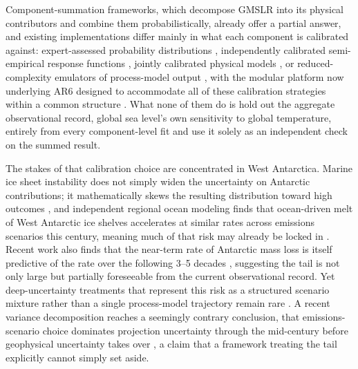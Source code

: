 \documentclass[12pt]{article}
\begin{document}
Component-summation frameworks, which decompose GMSLR into its physical
contributors and combine them probabilistically, already offer a partial
answer, and existing implementations differ mainly in what each component
is calibrated against: expert-assessed probability distributions
\citep{Kopp2014}, independently calibrated semi-empirical response
functions \citep{Mengel2016}, jointly calibrated physical models
\citep{Wong2017}, or reduced-complexity emulators of process-model output
\citep{Nauels2017}, with the modular platform now underlying AR6 designed
to accommodate all of these calibration strategies within a common
structure \citep{Kopp2023}. What none of them do is hold out the aggregate
observational record, global sea level's own sensitivity to global
temperature, entirely from every component-level fit and use it solely as
an independent check on the summed result.

The stakes of that calibration choice are concentrated in West Antarctica.
Marine ice sheet instability does not simply widen the uncertainty on
Antarctic contributions; it mathematically skews the resulting
distribution toward high outcomes \citep{Robel2019}, and independent
regional ocean modeling finds that ocean-driven melt of West Antarctic ice
shelves accelerates at similar rates across emissions scenarios this
century, meaning much of that risk may already be locked in
\citep{Naughten2023}. Recent work also finds that the near-term rate of
Antarctic mass loss is itself predictive of the rate over the following
3--5 decades \citep{McCormack2026}, suggesting the tail is not
only large but partially foreseeable from the current observational
record. Yet deep-uncertainty treatments that represent this risk as a
structured scenario mixture rather than a single process-model trajectory
remain rare \citep[e.g.,][]{Bakker2017}. A recent variance decomposition
reaches a seemingly contrary conclusion, that emissions-scenario choice
dominates projection uncertainty through the mid-century before
geophysical uncertainty takes over \citep{Darnell2025}, a claim that a
framework treating the tail explicitly cannot simply set aside.
\end{document}
